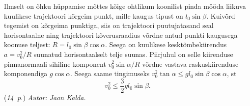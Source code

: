 \documentclass[12pt,a5paper]{article}
\newcommand{\punktid}[1]{(\emph{#1~p.})}
\newcommand{\autor}[1]{\emph{ Autor: #1.}}
\begin{document}
\osa Ilmselt on õhku hüppamise mõttes kõige ohtlikum koonilist pinda mööda liikuva kuulikese trajektoori kõrgeim punkt, mille kaugus tipust on $l_0\sin\beta$. Kuivõrd tegemist on kõrgeima punktiga, siis on trajektoori puutujatasand seal horisontaalne ning trajektoori kõverusraadius võrdne antud punkti kaugusega koonuse teljest: $R=l_0\sin\beta\cos\alpha$. Seega on kuulikese kesktõmbekiirendus $a=v_0^2/R$ suunatud horisontaalselt telje suunas. Piirjuhul on selle kiirenduse pinnanormaali sihiline komponent $v_0^2\sin\alpha/R$ võrdne vastava raskuskiirenduse komponendiga $g\cos\alpha$. Seega saame tingimuseks $v_0^2\tan\alpha\le gl_0\sin\beta\cos\alpha$, st $$v_0^2\le \frac{3}{2}gl_0\sin\beta.$$
\punktid{14} \autor{Jaan Kalda}
\end{document}
